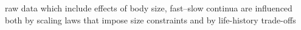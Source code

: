 raw data which include effects of body size, fast–slow continua are influenced both by scaling laws that impose size constraints and by life-history trade-offs                                                                                                                                                                                                                                                                                                                                                                                                                                                                                                                                                                                                             \\
